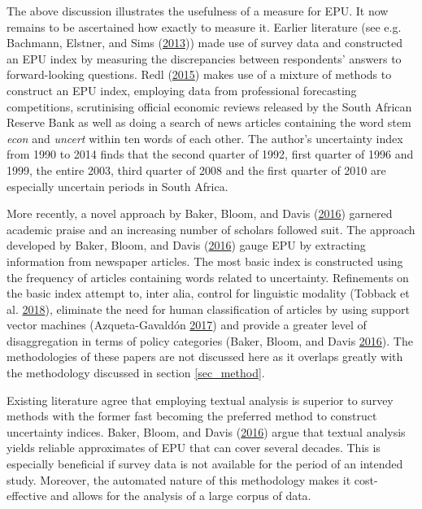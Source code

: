 \documentclass[11pt,preprint, authoryear]{elsarticle}
\numberwithin{equation}{section}
\numberwithin{figure}{section}
\numberwithin{table}{section}
\begin{document}
The above discussion illustrates the usefulness of a measure for EPU. It
now remains to be ascertained how exactly to measure it. Earlier
literature (see e.g. Bachmann, Elstner, and Sims
(\protect\hyperlink{ref-Bachmann2013}{2013})) made use of survey data
and constructed an EPU index by measuring the discrepancies between
respondents' answers to forward-looking questions. Redl (\protect\hyperlink{ref-Redl2015}{2015}) makes use of a mixture of methods to construct an EPU index, employing data from professional forecasting competitions, scrutinising official economic reviews released by the South African Reserve Bank as well as doing a search of news articles containing the word stem \textit{econ} and \textit{uncert} within ten words of each other. The author's uncertainty index from 1990 to 2014 finds that the second quarter of 1992, first quarter of 1996 and 1999, the entire 2003, third quarter of 2008 and the first quarter of 2010 are especially uncertain periods in South Africa.  

More recently, a novel approach by Baker, Bloom, and Davis
(\protect\hyperlink{ref-Baker2016}{2016}) garnered academic praise and
an increasing number of scholars followed suit. The approach developed
by Baker, Bloom, and Davis (\protect\hyperlink{ref-Baker2016}{2016})
gauge EPU by extracting information from newspaper articles. The most
basic index is constructed using the frequency of articles containing
words related to uncertainty. Refinements on the basic index attempt to,
inter alia, control for linguistic modality (Tobback et al.
\protect\hyperlink{ref-Tobback2018}{2018}), eliminate the need for human
classification of articles by using support vector machines
(Azqueta-Gavaldón \protect\hyperlink{ref-Azqueta-Gavaldon2017}{2017})
and provide a greater level of disaggregation in terms of policy
categories (Baker, Bloom, and Davis
\protect\hyperlink{ref-Baker2016}{2016}). The methodologies of these
papers are not discussed here as it overlaps greatly with the
methodology discussed in section \ref{sec_method}.

Existing literature agree that employing textual analysis is superior to survey methods with the former fast becoming the preferred method to construct uncertainty indices. Baker, Bloom, and Davis (\protect\hyperlink{ref-Baker2016}{2016}) argue that textual analysis yields reliable approximates of EPU that can cover several decades. This is especially beneficial if survey data is not available for the period of an intended study. Moreover, the automated nature of this methodology makes it cost-effective and allows for the analysis of a large corpus of data. 
\end{document}
